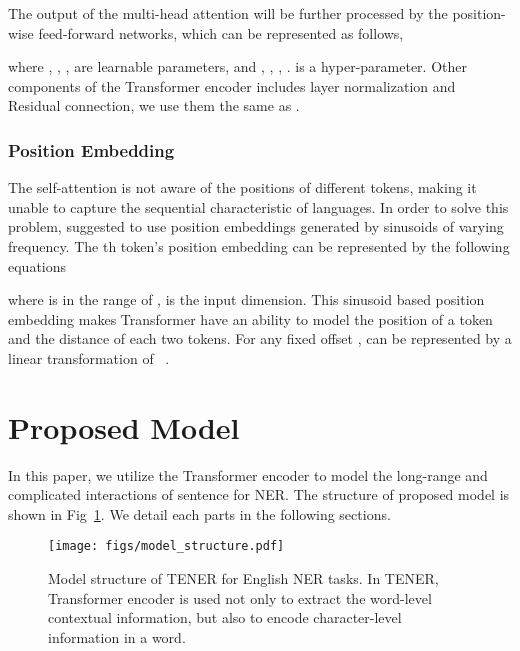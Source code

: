 \documentclass[11pt,a4paper]{article}
\begin{document}
The output of the multi-head attention will be further processed by the position-wise feed-forward networks, which can be represented as follows,

\vspace{-1em}
{\small

}where , , ,  are learnable parameters, and , , , .  is a hyper-parameter. Other components of the Transformer encoder includes layer normalization and Residual connection, we use them the same as \cite{vaswani2017attention}.

\subsubsection{Position Embedding} \label{sec:position_embedding}

The self-attention is not aware of the positions of different tokens, making it unable to capture the sequential characteristic of languages. In order to solve this problem, \citep{vaswani2017attention} suggested to use position embeddings generated by sinusoids of varying frequency. The th token's position embedding can be represented by the following equations

\vspace{-1em}
{\small
  
}where  is in the range of ,  is the input dimension. This sinusoid based position embedding makes Transformer have an ability to model the position of a token and the distance of each two tokens. For any fixed offset ,  can be represented by a linear transformation of ~\cite{vaswani2017attention}.



\section{Proposed Model}

In this paper, we utilize the Transformer encoder to model the long-range and complicated interactions of sentence for NER.
The structure of proposed model is shown in Fig~\ref{fig:whole_model_structure}. We detail each parts in the following sections.

\begin{figure}[t]
    \centering
    \texttt{[image: figs/model\_structure.pdf]}
    \caption{Model structure of TENER for English NER tasks. In TENER, Transformer encoder is used not only to extract the word-level contextual information, but also to encode character-level information in a word.} \label{fig:whole_model_structure}
\end{figure}
\end{document}
